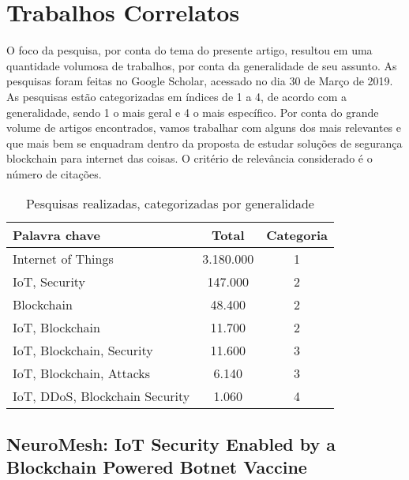 \section{Trabalhos Correlatos}
O foco da pesquisa, por conta do tema do presente artigo, resultou em uma quantidade volumosa de trabalhos, por conta da generalidade de seu assunto. As pesquisas foram feitas no Google Scholar, acessado no dia 30 de Março de 2019. As pesquisas estão categorizadas em índices de 1 a 4, de acordo com a generalidade, sendo 1 o mais geral e 4 o mais específico. Por conta do grande volume de artigos encontrados, vamos trabalhar com alguns dos mais relevantes e que mais bem se enquadram dentro da proposta de estudar soluções de segurança blockchain para internet das coisas. O critério de relevância considerado é o número de citações.

\begin{table}[H]
\centering
\large
\caption{Pesquisas realizadas, categorizadas por generalidade}\label{tab1}
\begin{tabular}{|l|c|c|}
\hline
\textbf{Palavra chave} & \textbf{Total} & \textbf{Categoria}\\
\hline
Internet of Things & 3.180.000 & 1\\
IoT, Security & 147.000 & 2\\
Blockchain & 48.400 & 2\\
IoT, Blockchain & 11.700 & 2\\
IoT, Blockchain, Security & 11.600 & 3\\
IoT, Blockchain, Attacks & 6.140 & 3\\
IoT, DDoS, Blockchain Security & 1.060 & 4\\
\hline
\end{tabular}
\end{table}

\subsection{NeuroMesh: IoT Security Enabled by a
Blockchain Powered Botnet Vaccine}

